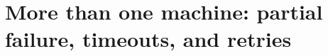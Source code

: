 \chapter{More than one machine: partial failure, timeouts, and retries}
\label{ch:more-than-one-machine-partial-failure}

